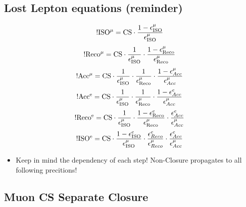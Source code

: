 \documentclass{beamer}
\begin{document}
\subsection{Lost Lepton equations (reminder)}
\begin{frame}
 \begin{equation}
 \rm !ISO^{\mu} = {\rm CS}\cdot \frac{1-\epsilon_{\rm ISO}^{\mu}}{\epsilon_{\rm ISO}^{\mu}} 
\label{eq:isolation_muon}
\end{equation}
\begin{equation}
 {\rm !Reco^{\mu}} = {\rm CS}\cdot \frac{1}{\epsilon_{\rm ISO}^{\mu}} \cdot \frac{1-\epsilon_{\rm Reco}^{\mu}}{\epsilon_{\rm Reco}^{\mu}}
\label{eq:reconstruction_muon}
\end{equation}
\begin{equation}
 {\rm !Acc^{\mu}} = {\rm CS}\cdot \frac{1}{\epsilon_{\rm ISO}^{\mu}}\cdot \frac{1}{\epsilon_{\rm Reco}^{\mu}} \cdot \frac{1-\epsilon^{\mu}_{Acc}}{\epsilon^{\mu}_{Acc}}
\label{eq:acceptance_muon}
\end{equation}
\begin{equation}
{\rm !Acc^{e}} = {\rm CS}\cdot \frac{1}{\epsilon_{\rm ISO}^{\mu}}\cdot \frac{1}{\epsilon_{\rm Reco}^{\mu}}  \cdot \frac{1 - \epsilon^{e}_{Acc}}{\epsilon^{\mu}_{Acc}}
 \label{eq:elec_acc}
\end{equation}
\begin{equation}
{\rm !Reco^{e}} = {\rm CS}\cdot \frac{1}{\epsilon_{\rm ISO}^{\mu}}\cdot \frac{1-\epsilon_{\rm Reco}^{e}}{\epsilon_{\rm Reco}^{\mu}}  \cdot \frac{\epsilon^{e}_{Acc}}{\epsilon^{\mu}_{Acc}}
 \label{eq:elec_reco}
\end{equation}
\begin{equation}
{\rm !ISO^{e}} = {\rm CS}\cdot \frac{1-\epsilon_{\rm ISO}^{e}}{\epsilon_{\rm ISO}^{\mu}} \cdot \frac{\epsilon^{e}_{Reco}}{\epsilon^{\mu}_{Reco}} \cdot \frac{\epsilon^{e}_{Acc}}{\epsilon^{\mu}_{Acc}}
\label{eq:elec_iso}
\end{equation}
\begin{itemize}
 \item Keep in mind the dependency of each step! Non-Closure propagates to all following precitions!
\end{itemize}

\end{frame}
\subsection{Muon CS Separate Closure}
\end{document}
